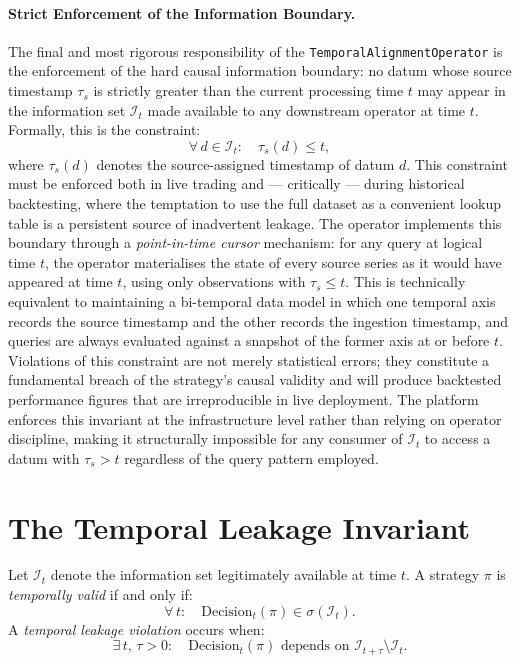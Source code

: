 \documentclass[12pt,openany]{book}
\numberwithin{equation}{chapter}
\theoremstyle{plain}
\theoremstyle{definition}
\theoremstyle{remark}
\begin{document}
\paragraph{Strict Enforcement of the Information Boundary.}
The final and most rigorous responsibility of the \texttt{TemporalAlignmentOperator} is the
enforcement of the hard causal information boundary: no datum whose source timestamp $\tau_s$ is
strictly greater than the current processing time $t$ may appear in the information set
$\mathcal{I}_t$ made available to any downstream operator at time $t$. Formally, this is the
constraint:
\begin{equation}
    \forall\, d \in \mathcal{I}_t :\quad \tau_s(d) \leq t,
\end{equation}
where $\tau_s(d)$ denotes the source-assigned timestamp of datum $d$. This constraint must be
enforced both in live trading and — critically — during historical backtesting, where the
temptation to use the full dataset as a convenient lookup table is a persistent source of
inadvertent leakage. The operator implements this boundary through a \emph{point-in-time cursor}
mechanism: for any query at logical time $t$, the operator materialises the state of every source
series as it would have appeared at time $t$, using only observations with $\tau_s \leq t$.
This is technically equivalent to maintaining a bi-temporal data model in which one temporal axis
records the source timestamp and the other records the ingestion timestamp, and queries are always
evaluated against a snapshot of the former axis at or before $t$. Violations of this constraint
are not merely statistical errors; they constitute a fundamental breach of the strategy's causal
validity and will produce backtested performance figures that are irreproducible in live deployment.
The platform enforces this invariant at the infrastructure level rather than relying on operator
discipline, making it structurally impossible for any consumer of $\mathcal{I}_t$ to access a
datum with $\tau_s > t$ regardless of the query pattern employed.

\section{The Temporal Leakage Invariant}

Let $\mathcal{I}_t$ denote the information set legitimately available at
time $t$. A strategy $\pi$ is \emph{temporally valid} if and only if:
\begin{equation}
    \forall\, t :\quad \text{Decision}_t(\pi) \in \sigma(\mathcal{I}_t).
\end{equation}
A \emph{temporal leakage violation} occurs when:
\begin{equation}
    \exists\, t,\, \tau > 0 :\quad \text{Decision}_t(\pi)
    \text{ depends on } \mathcal{I}_{t+\tau} \setminus \mathcal{I}_t.
\end{equation}
\end{document}
